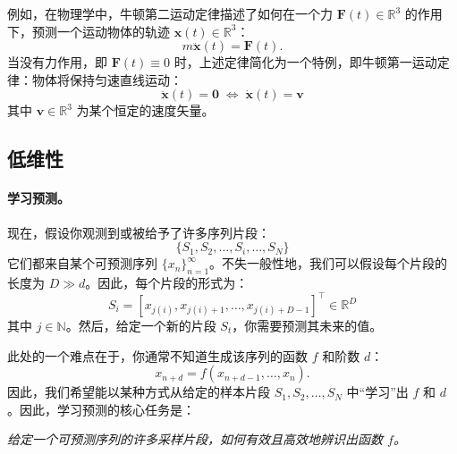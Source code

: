 \documentclass[../../book-main_zh.tex]{subfiles}
\begin{document}
\begin{example}
    例如，在物理学中，牛顿第二运动定律描述了如何在一个力 $\boldsymbol{F}(t) \in \mathbb{R}^3$ 的作用下，预测一个运动物体的轨迹 $\boldsymbol{x}(t) \in \mathbb{R}^3$：
\begin{equation}
    m\ddot{\boldsymbol{x}}(t) = \boldsymbol{F}(t).
\end{equation}
    当没有力作用，即 $\boldsymbol{F}(t) \equiv 0$ 时，上述定律简化为一个特例，即牛顿第一运动定律：物体将保持匀速直线运动：
\begin{equation}
   \ddot{\boldsymbol{x}}(t) = \boldsymbol{0} \; \Leftrightarrow \; \dot{\boldsymbol{x}}(t) = \boldsymbol{v}
\end{equation}
    其中 $\boldsymbol{v} \in \mathbb{R}^3$ 为某个恒定的速度矢量。
\end{example}




\subsection{低维性}\label{sec:intro-low-dimensionality}
\paragraph{学习预测。}
现在，假设你观测到或被给予了许多序列片段：
\begin{equation}
    \{S_1, S_2, \ldots, S_i, \ldots, S_N\}
\end{equation}
它们都来自某个可预测序列 $\{x_n\}_{n=1}^\infty$。不失一般性地，我们可以假设每个片段的长度为 $D \gg d$。因此，每个片段的形式为：
\begin{equation}
    S_i = [x_{j(i)}, x_{j(i)+1}, \ldots, x_{j(i)+D-1}]^\top \in \mathbb{R}^D
\end{equation}
其中 $j \in \mathbb{N}$。然后，给定一个新的片段 $S_t$，你需要预测其未来的值。

此处的一个难点在于，你通常不知道生成该序列的函数 $f$ 和阶数 $d$：
\begin{equation}
    x_{n+d} = f(x_{n+d-1}, \ldots,  x_{n}).
\label{eqn:sequence-order-d}
\end{equation}
因此，我们希望能以某种方式从给定的样本片段 $S_1, S_2, \ldots, S_N$ 中“学习”出 $f$ 和 $d$。因此，学习预测的核心任务是：
\begin{center}
{\em 给定一个可预测序列的许多采样片段，如何有效且高效地辨识出函数 $f$。}
\end{center}
\end{document}
